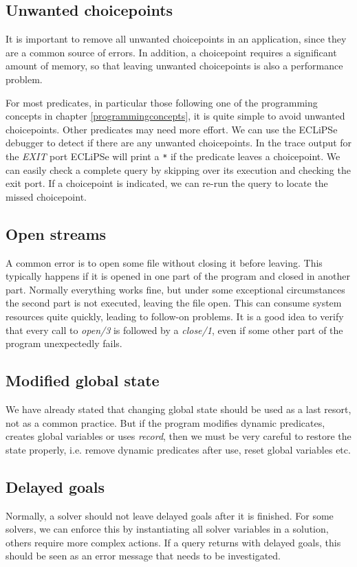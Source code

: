 \documentclass[a4paper,12pt]{report}
\begin{document}
\subsection{Unwanted choicepoints}
It is important to remove all unwanted choicepoints in an application, since they are a common source of errors. In addition, a choicepoint requires a significant amount of memory, so that leaving unwanted choicepoints is also a performance problem.

For most predicates, in particular those following one of the programming concepts in chapter \ref{programmingconcepts}, it is quite simple to avoid unwanted choicepoints. Other predicates may need more effort. We can use the ECLiPSe debugger to detect if there are any unwanted choicepoints. In the trace output for the {\it EXIT} port ECLiPSe will print a \verb+*+ if the predicate leaves a choicepoint. We can easily check a complete query by skipping over its execution and checking the exit port. If a choicepoint is indicated, we can re-run the query to locate the missed choicepoint. 

\subsection{Open streams}
A common error is to open some file without closing it before leaving. This typically happens if it is opened in one part of the program and closed in another part. Normally everything works fine, but under some exceptional circumstances the second part is not executed, leaving the file open. This can consume system resources quite quickly, leading to follow-on problems. It is a good idea to verify that every call to {\it open/3} is followed by a {\it close/1}, even if some other part of the program unexpectedly fails.

\subsection{Modified global state}
We have already stated that changing global state should be used as a last resort, not as a common practice. But if the program modifies dynamic predicates, creates global variables or uses {\it record}, then we must be very careful to restore the state properly, i.e. remove dynamic predicates after use, reset global variables etc.

\subsection{Delayed goals}
Normally, a solver should not leave delayed goals after it is finished. For some solvers, we can enforce this by instantiating all solver variables in a solution, others require more complex actions. If a query returns with delayed goals, this should be seen as an error message that needs to be investigated.
\appendix
\end{document}
